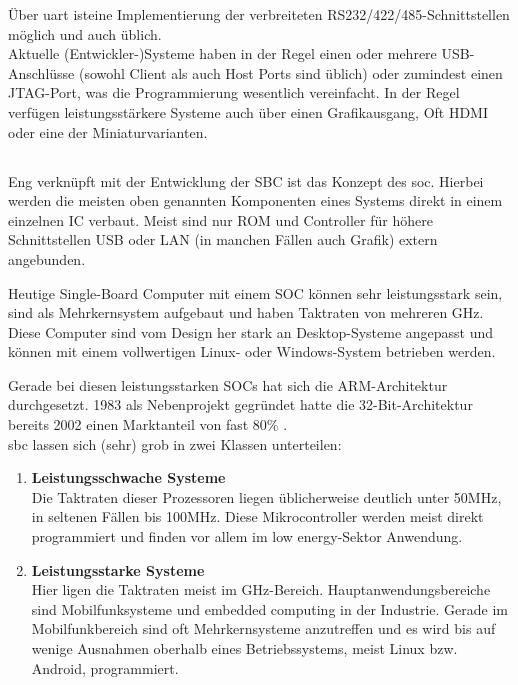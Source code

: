 Über \gls{uart} isteine Implementierung der verbreiteten RS232/422/485-Schnittstellen möglich und auch üblich.\\

Aktuelle (Entwickler-)Systeme haben in der Regel einen oder mehrere USB-Anschlüsse (sowohl Client als auch Host Ports sind üblich) oder zumindest einen JTAG-Port, was die Programmierung wesentlich vereinfacht. In der Regel verfügen leistungsstärkere Systeme auch über einen Grafikausgang, Oft HDMI oder eine der Miniaturvarianten.


\subsection{}
Eng verknüpft mit der Entwicklung der SBC ist das Konzept des \gls{soc}. Hierbei werden die meisten oben genannten Komponenten eines Systems direkt in einem einzelnen IC verbaut. Meist sind nur ROM und Controller für höhere Schnittstellen USB oder LAN (in manchen Fällen auch Grafik) extern angebunden.

Heutige Single-Board Computer mit einem SOC können sehr leistungsstark sein, sind als Mehrkernsystem aufgebaut und haben Taktraten von mehreren GHz. Diese Computer sind vom Design her stark an Desktop-Systeme angepasst und können mit einem vollwertigen Linux- oder Windows-System betrieben werden.

Gerade bei diesen leistungsstarken SOCs hat sich die ARM-Architektur durchgesetzt. 1983 als Nebenprojekt gegründet hatte die 32-Bit-Architektur bereits 2002 einen Marktanteil von fast 80\% \cite{stiller2002}.\\

\noindent \gls{sbc} lassen sich (sehr) grob in zwei Klassen unterteilen:

\begin{enumerate}
\item \textbf{Leistungsschwache Systeme}\\
Die Taktraten dieser Prozessoren liegen üblicherweise deutlich unter 50MHz, in seltenen Fällen bis 100MHz. Diese Mikrocontroller werden meist direkt programmiert und finden vor allem im low energy-Sektor Anwendung.
\item \textbf{Leistungsstarke Systeme}\\
Hier ligen die Taktraten meist im GHz-Bereich. Hauptanwendungsbereiche sind Mobilfunksysteme und embedded computing in der Industrie. Gerade im Mobilfunkbereich sind oft Mehrkernsysteme anzutreffen und es wird bis auf wenige Ausnahmen oberhalb eines Betriebssystems, meist Linux bzw. Android, programmiert.
\end{enumerate}


